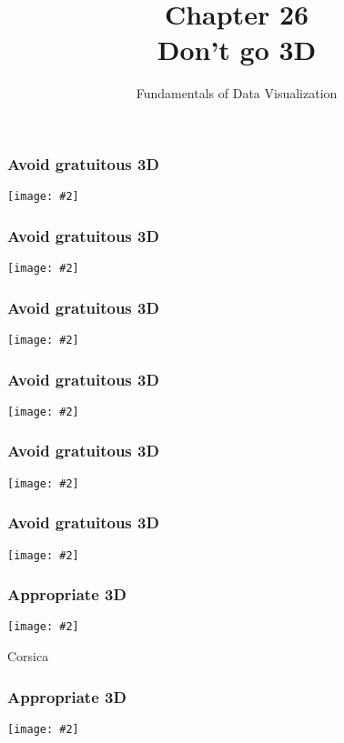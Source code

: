 \documentclass{beamer}
\author{Fundamentals of Data Visualization}
\title{Chapter 26\\Don't go 3D}
\newcommand{\fig}[2]{\centerline{\texttt{[image: \#2]}}}
\newcommand{\bfr}[1]{\begin{frame}[fragile]\frametitle{{ #1 }}}
\begin{document}
\begin{frame}
\maketitle
\end{frame}

\bfr{Avoid gratuitous 3D}
\fig{.8}{rotated-pie-1.png}
\end{frame}


\bfr{Avoid gratuitous 3D}
\fig{.8}{titanic-3d-1.png}
\end{frame}


\bfr{Avoid gratuitous 3D}
\fig{.7}{mtcars-3d-1.png}
\end{frame}


\bfr{Avoid gratuitous 3D}
\fig{1}{mtcars-2d-multiple-1.png}
\end{frame}


\bfr{Avoid gratuitous 3D}
\fig{.8}{mtcars-2d-size-1.png}
\end{frame}


\bfr{Avoid gratuitous 3D}
\fig{.8}{VA-death-rates-3d-1.png}
\end{frame}


\bfr{Appropriate 3D}
\fig{.8}{Corsica.png}
\centerline{Corsica}
\end{frame}

\bfr{Appropriate 3D}
\fig{.7}{protein-3d-1.png}
\end{frame}
\end{document}
